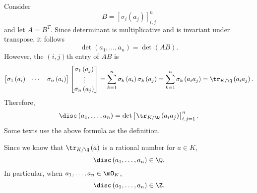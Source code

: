 \documentclass[pmath441]{subfiles}
\begin{document}
    \np Consider
    \begin{equation*}
        B = \left[ \sigma_i\left( a_j \right) \right]^n_{i,j}
    \end{equation*}
    and let $A = B^{T}$. Since determinant is multiplicative and is invariant under transpose, it follows
    \begin{equation*}
        \det\left( a_1,\ldots,a_n \right) = \det\left( AB \right).
    \end{equation*}
    However, the $\left( i,j \right)$th entry of $AB$ is
    \begin{equation*}
        \begin{bmatrix} \sigma_1\left( a_i \right) & \cdots & \sigma_n\left( a_i \right) \end{bmatrix} \begin{bmatrix} \sigma_1\left( a_j \right)\\\vdots\\\sigma_n\left( a_j \right) \end{bmatrix} 
        = \sum^{n}_{k=1} \sigma_k\left( a_i \right)\sigma_k\left( a_j \right)
        = \sum^{n}_{k=1} \sigma_k\left( a_ia_j \right)
        = \tr_{K /\Q}\left( a_ia_j \right).
    \end{equation*}
    Therefore,
    \begin{equation*}
        \disc\left( a_1,\ldots,a_n \right) = \det \left[ \tr_{K /\Q}\left( a_ia_j \right) \right]^n_{i,j=1}.
    \end{equation*}
    Some texts use the above formula as the definition.

    Since we know that $\tr_{K /\Q}\left( a \right)$ is a rational number for $a\in K$,
    \begin{equation*}
        \disc\left( a_1,\ldots,a_n \right) \in \Q.
    \end{equation*}
    In particular, when $a_1,\ldots,a_n\in\mO_K$,
    \begin{equation*}
        \disc\left( a_1,\ldots,a_n \right)\in\Z.
    \end{equation*}
\end{document}
